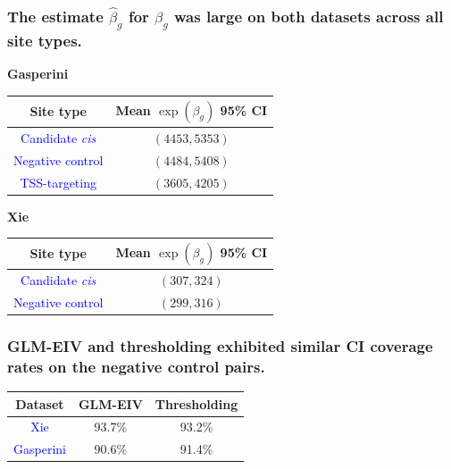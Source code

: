 \documentclass{beamer}
\begin{document}
\begin{frame}
\frametitle{The estimate $\hat{\beta}_g$ for $\beta_g$ was large on both datasets across all site types.}
\begin{center}
\textbf{Gasperini}
\end{center}
\begin{center}
\begin{tabular}{|c|c|}
\hline 
Site type & Mean $\exp\left(\beta_g\right)$ 95\% CI \\ 
\hline 
\textcolor{blue}{Candidate \textit{cis}} & $(4453, 5353)$ \\ 
\hline 
\textcolor{blue}{Negative control} &  $(4484, 5408)$ \\ 
\hline
\textcolor{blue}{TSS-targeting} & $(3605, 4205)$ \\
\hline
\end{tabular} 
\end{center}

\begin{center}
\textbf{Xie}
\end{center}
\begin{center}
\begin{tabular}{|c|c|}
\hline 
Site type & Mean $\exp\left(\beta_g\right)$ 95\% CI \\ 
\hline 
\textcolor{blue}{Candidate \textit{cis}} & $(307, 324)$ \\ 
\hline 
\textcolor{blue}{Negative control} &  $(299, 316)$ \\
\hline
\end{tabular} 
\end{center}



\end{frame}


\begin{frame}
\frametitle{GLM-EIV and thresholding exhibited similar CI coverage rates on the negative control pairs.}
\begin{center}
\begin{tabular}{|c|c|c|}
\hline 
Dataset & GLM-EIV & Thresholding \\ 
\hline 
\textcolor{blue}{Xie} & 93.7\% & 93.2\% \\ 
\hline 
\textcolor{blue}{Gasperini} & 90.6\% & 91.4\%  \\ 
\hline 
\end{tabular}
\end{center}
\end{frame}


\end{document}
